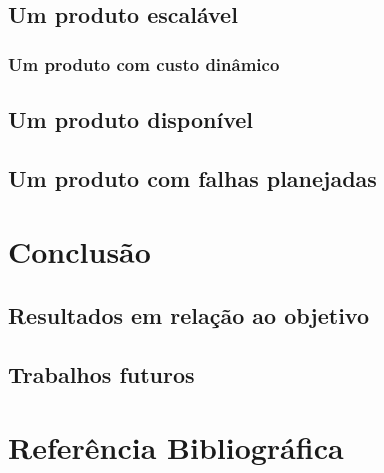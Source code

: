 \documentclass[]{../class/politex}
\begin{document}
    \section{Um produto escalável}

      \subsection{Um produto com custo dinâmico}

    \section{Um produto disponível}

    \section{Um produto com falhas planejadas}

  \chapter{Conclusão}

    \section{Resultados em relação ao objetivo}

    \section{Trabalhos futuros}

  \chapter{Referência Bibliográfica}
\end{document}
